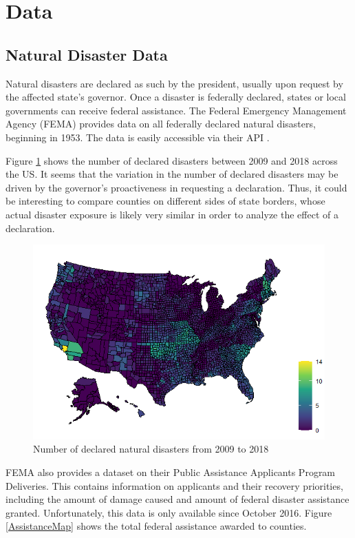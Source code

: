 
\section{Data}

\subsection{Natural Disaster Data}

Natural disasters are declared as such by the president, usually upon request by the affected state's governor. Once a disaster is federally declared, states or local governments can receive federal assistance. The Federal Emergency Management Agency (FEMA) provides data on all federally declared natural disasters, beginning in 1953. The data is easily accessible via their API \citep{rfema}.

Figure \ref{DisasterMap} shows the number of declared disasters between 2009 and 2018 across the US. It seems that the variation in the number of declared disasters may be driven by the governor's proactiveness in requesting a declaration. Thus, it could be interesting to compare counties on different sides of state borders, whose actual disaster exposure is likely very similar in order to analyze the effect of a declaration.


\begin{figure}[!h]
	\centering
	\includegraphics[scale=0.7]{"../Code & Data/DisasterMap.png"}
	\caption{Number of declared natural disasters from 2009 to 2018}
	\label{DisasterMap}
\end{figure}


FEMA also provides a dataset on  their Public Assistance Applicants Program Deliveries. This contains information on applicants and their recovery priorities, including the amount of damage caused and amount of federal disaster assistance granted. Unfortunately, this data is only available since October 2016. Figure \ref{AssistanceMap} shows the total federal assistance awarded to counties.


